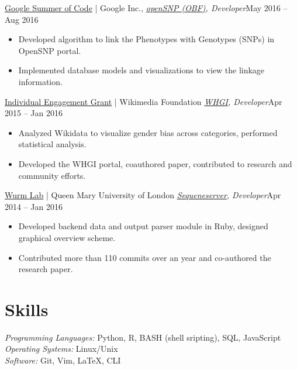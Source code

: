 \documentclass[letter]{res}
\begin{document}
\begin{resume}
 \href{https://summerofcode.withgoogle.com}{Google Summer of Code} | Google Inc., \newline
 {\sl \href{https://summerofcode.withgoogle.com/organizations/5693436329984000/#4637393399316480}{openSNP (OBF)}, Developer}\hfill  May 2016 – Aug 2016\\
  \vspace{-2mm}
 \begin{itemize}
  \item Developed algorithm to link the Phenotypes with Genotypes (SNPs) in OpenSNP portal.
  \item Implemented database models and visualizations to view the linkage information.
 \end{itemize}
  \vspace{-2mm}

 \href{https://meta.wikimedia.org/wiki/Grants:IEG/WIGI:_Wikipedia_Gender_Index}{Individual Engagement Grant} | Wikimedia Foundation \newline
 {\sl \href{http://whgi.wmflab.org}{WHGI}, Developer}\hfill Apr 2015 – Jan 2016\\
 \vspace{-2mm}
 \begin{itemize}
  \item Analyzed Wikidata to visualize gender bias across categories, performed statistical analysis.
  \item Developed the WHGI portal, coauthored paper, contributed to research and community efforts.
 \end{itemize}
 \vspace{-2mm}

 \href{http://wurmlab.github.io/}{Wurm Lab} | Queen Mary University of London \newline
 {\sl \href{http://sequenceserver.com}{Sequeneserver}, Developer}\hfill Apr 2014 – Jan 2016\\
 \vspace{-2mm}
 \begin{itemize}
  \item Developed backend data and output parser module in Ruby, designed
  graphical overview scheme.
  \item Contributed more than 110 commits over an year and co-authored the research paper.
 \end{itemize}
 \vspace{-2mm}

\section{Skills}
{\sl Programming Languages:}  Python, R, BASH (shell sripting), SQL, JavaScript \\
{\sl Operating Systems:} Linux/Unix \\
{\sl Software:} Git, Vim, \LaTeX, CLI
\vspace{-2mm}


\end{resume}
\end{document}
